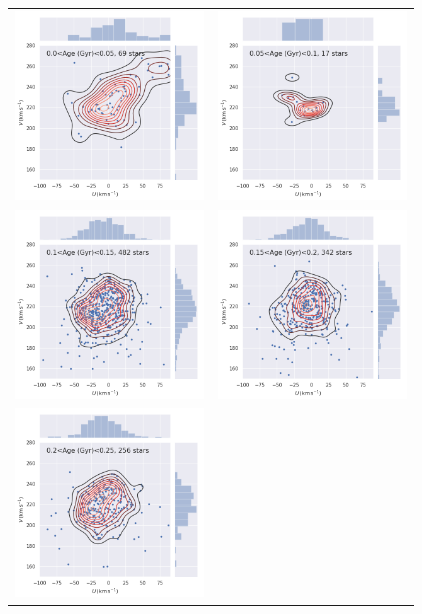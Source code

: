 \begin{figure}[htbp]
   \centering
\begin{tabular}{cc}
\includegraphics[width=5cm]{fig/UV/0to50Myr_z0.1kpc_hist2d.png}&
\includegraphics[width=5cm]{fig/UV/50to100Myr_z0.1kpc_hist2d.png}\\
\includegraphics[width=5cm]{fig/UV/100to150Myr_z0.1kpc_hist2d.png}&
\includegraphics[width=5cm]{fig/UV/150to200Myr_z0.1kpc_hist2d.png}\\
\includegraphics[width=5cm]{fig/UV/200to250Myr_z0.1kpc_hist2d.png}&

\end{tabular}
\end{figure}
